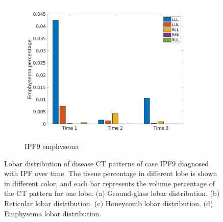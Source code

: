 \begin{figure}[H]
\begin{subfigure}{.46\linewidth}
  \includegraphics[width=\linewidth,trim={{.0\wd0} {.0\wd0} {.0\wd0} {.0\wd0}},clip]{Appendix/Image_AppexA/LobarDistribution/IPF9EmphysemaLobarRegionDiseaseDistributionOverTime.jpg}
  \caption{IPF9 emphysema}
  \label{fig:IPF9LobarRegionDiseaseDistributionOverTime-d}
\end{subfigure}
\caption{Lobar distribution of disease CT patterns of case IPF9 diagnosed with IPF over time. The tissue percentage in different lobe is shown in different color, and each bar represents the volume percentage of the CT pattern for one lobe. (a) Ground-glass lobar distribution. (b) Reticular lobar distribution. (c) Honeycomb lobar distribution. (d) Emphysema lobar distribution.}
\label{fig:IPF9LobarRegionDiseaseDistributionOverTime}
\end{figure}

